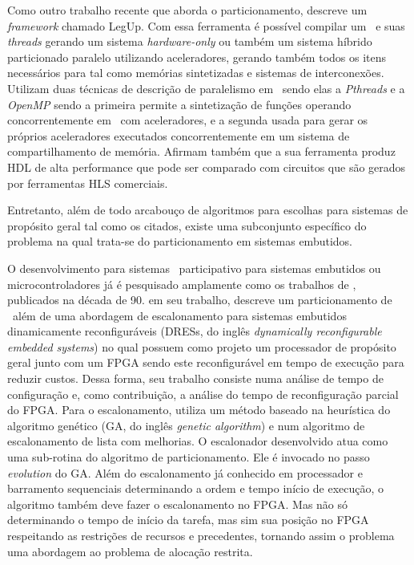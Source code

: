 	Como outro trabalho recente que aborda o particionamento, \cite{Choi2016} descreve um \textit{framework} chamado LegUp.
	Com essa ferramenta é possível compilar um \software\ e suas \textit{threads} gerando um sistema \textit{hardware-only} ou também um sistema híbrido particionado paralelo utilizando aceleradores, gerando também todos os itens necessários para tal como memórias sintetizadas e sistemas de interconexões. Utilizam duas técnicas de descrição de paralelismo em \software\ sendo elas a \textit{Pthreads} e a \textit{OpenMP} sendo a primeira permite a sintetização de funções operando concorrentemente em \hardware\ com aceleradores, e a segunda usada para gerar os próprios aceleradores executados concorrentemente em um sistema de compartilhamento de memória.
	Afirmam também que a sua ferramenta produz HDL de alta performance que pode ser comparado com circuitos que são gerados por ferramentas HLS comerciais.

	Entretanto, além de todo arcabouço de algoritmos para escolhas para sistemas de propósito geral tal como os citados, existe uma subconjunto específico do problema na qual trata-se do particionamento em sistemas embutidos.


	O desenvolvimento para sistemas \hs\ participativo para sistemas embutidos ou microcontroladores já é pesquisado amplamente como os trabalhos de \cite{Ernst1993, Gupta1995, Hardt1995, Gajski1994, Bolsens1997}, publicados na década de 90.
	\cite{Mei2000} em seu trabalho, descreve um particionamento de \hs\ além de uma abordagem de escalonamento para sistemas embutidos dinamicamente reconfiguráveis (DRESs, do inglês \textit{dynamically reconfigurable embedded systems}) no qual possuem como projeto um processador de propósito geral junto com um FPGA sendo este reconfigurável em tempo de execução para reduzir custos. Dessa forma, seu trabalho consiste numa análise de tempo de configuração e, como contribuição, a análise do tempo de reconfiguração parcial do FPGA.
	Para o escalonamento, \cite{Mei2000} utiliza um método baseado na heurística do algoritmo genético (GA, do inglês \textit{genetic algorithm}) e num algoritmo de escalonamento de lista com melhorias.
	O escalonador desenvolvido atua como uma sub-rotina do algoritmo de particionamento. Ele é invocado no passo \textit{evolution} do GA. Além do escalonamento já conhecido em processador e barramento sequenciais determinando a ordem e tempo início de execução, o algoritmo também deve fazer o escalonamento no FPGA. Mas não só determinando o tempo de início da tarefa, mas sim sua posição no FPGA respeitando as restrições de recursos e precedentes, tornando assim o problema uma abordagem ao problema de alocação restrita.

